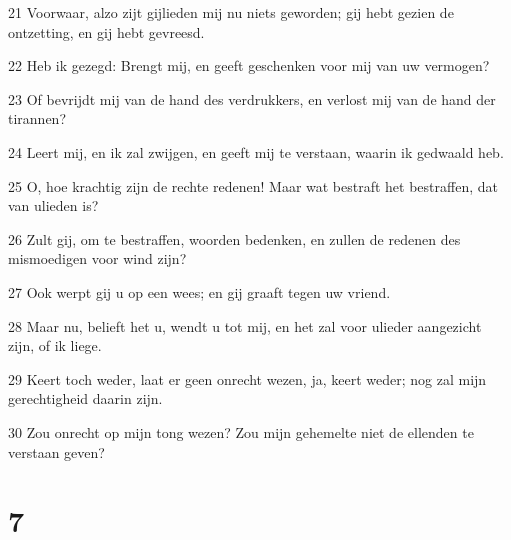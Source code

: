 \par 21 Voorwaar, alzo zijt gijlieden mij nu niets geworden; gij hebt gezien de ontzetting, en gij hebt gevreesd.
\par 22 Heb ik gezegd: Brengt mij, en geeft geschenken voor mij van uw vermogen?
\par 23 Of bevrijdt mij van de hand des verdrukkers, en verlost mij van de hand der tirannen?
\par 24 Leert mij, en ik zal zwijgen, en geeft mij te verstaan, waarin ik gedwaald heb.
\par 25 O, hoe krachtig zijn de rechte redenen! Maar wat bestraft het bestraffen, dat van ulieden is?
\par 26 Zult gij, om te bestraffen, woorden bedenken, en zullen de redenen des mismoedigen voor wind zijn?
\par 27 Ook werpt gij u op een wees; en gij graaft tegen uw vriend.
\par 28 Maar nu, belieft het u, wendt u tot mij, en het zal voor ulieder aangezicht zijn, of ik liege.
\par 29 Keert toch weder, laat er geen onrecht wezen, ja, keert weder; nog zal mijn gerechtigheid daarin zijn.
\par 30 Zou onrecht op mijn tong wezen? Zou mijn gehemelte niet de ellenden te verstaan geven?

\chapter{7}

